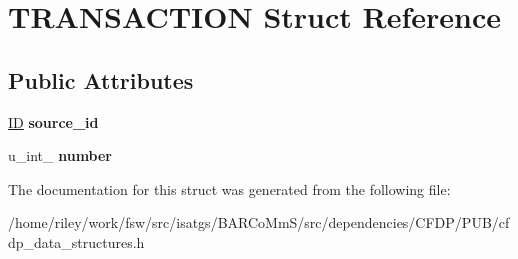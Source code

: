 \hypertarget{struct_t_r_a_n_s_a_c_t_i_o_n}{}\section{T\+R\+A\+N\+S\+A\+C\+T\+I\+ON Struct Reference}
\label{struct_t_r_a_n_s_a_c_t_i_o_n}
\subsection*{Public Attributes}
\begin{DoxyCompactItemize}
\item 
\hyperlink{struct_i_d}{ID} {\bfseries source\+\_\+id}\hypertarget{struct_t_r_a_n_s_a_c_t_i_o_n_a698ade09384507fb1bebd9b1169582ae}{}\label{struct_t_r_a_n_s_a_c_t_i_o_n_a698ade09384507fb1bebd9b1169582ae}

\item 
u\+\_\+int\+\_ {\bfseries number}\hypertarget{struct_t_r_a_n_s_a_c_t_i_o_n_a72a97fa01798321b3c09dd7fa28b3a36}{}\label{struct_t_r_a_n_s_a_c_t_i_o_n_a72a97fa01798321b3c09dd7fa28b3a36}

\end{DoxyCompactItemize}


The documentation for this struct was generated from the following file\+:\begin{DoxyCompactItemize}
\item 
/home/riley/work/fsw/src/isatgs/\+B\+A\+R\+Co\+Mm\+S/src/dependencies/\+C\+F\+D\+P/\+P\+U\+B/cfdp\+\_\+data\+\_\+structures.\+h\end{DoxyCompactItemize}
